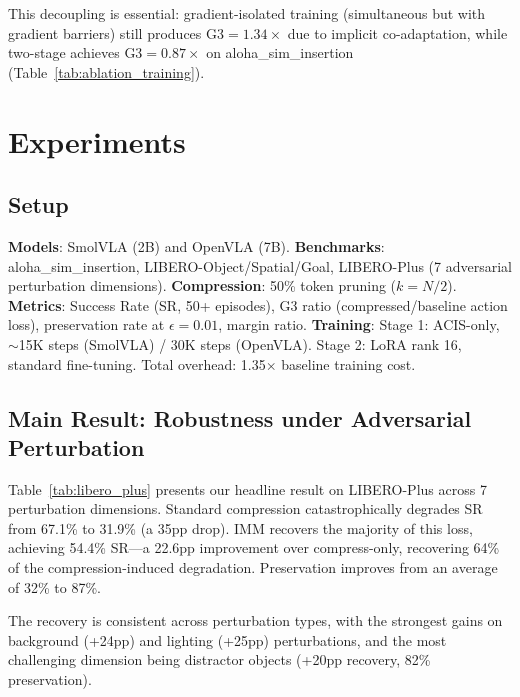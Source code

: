 \documentclass[10pt,twocolumn]{article}
\begin{document}
This decoupling is essential: gradient-isolated training (simultaneous but with gradient barriers) still produces G3${=}1.34\times$ due to implicit co-adaptation, while two-stage achieves G3${=}0.87\times$ on aloha\_sim\_insertion (Table~\ref{tab:ablation_training}).

\section{Experiments}
\label{sec:exp}

\subsection{Setup}
\textbf{Models}: SmolVLA (2B) and OpenVLA (7B). \textbf{Benchmarks}: aloha\_sim\_insertion, LIBERO-Object/Spatial/Goal, LIBERO-Plus (7 adversarial perturbation dimensions). \textbf{Compression}: 50\% token pruning ($k{=}N/2$). \textbf{Metrics}: Success Rate (SR, 50+ episodes), G3 ratio (compressed/baseline action loss), preservation rate at $\epsilon{=}0.01$, margin ratio. \textbf{Training}: Stage 1: ACIS-only, $\sim$15K steps (SmolVLA) / 30K steps (OpenVLA). Stage 2: LoRA rank 16, standard fine-tuning. Total overhead: 1.35$\times$ baseline training cost.

\subsection{Main Result: Robustness under Adversarial Perturbation}
\label{sec:main_result}

Table~\ref{tab:libero_plus} presents our headline result on LIBERO-Plus across 7 perturbation dimensions. Standard compression catastrophically degrades SR from 67.1\% to 31.9\% (a 35pp drop). IMM recovers the majority of this loss, achieving 54.4\% SR---a 22.6pp improvement over compress-only, recovering 64\% of the compression-induced degradation. Preservation improves from an average of 32\% to 87\%.

The recovery is consistent across perturbation types, with the strongest gains on background (+24pp) and lighting (+25pp) perturbations, and the most challenging dimension being distractor objects (+20pp recovery, 82\% preservation).
\end{document}
